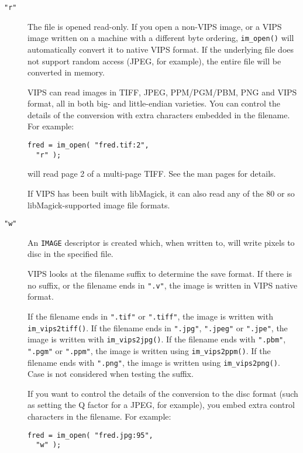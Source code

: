 \begin{description}

\item[\texttt{"r"}]
The file is opened read-only.
If you open a non-VIPS image, or a VIPS image written on a machine with a
different byte ordering, \verb+im_open()+ will automatically convert it to
native VIPS format. If the underlying file does not support random access
(JPEG, for example), the entire file will be converted in memory. 

VIPS can read images in TIFF, JPEG, PPM/\-PGM/\-PBM, PNG and VIPS
format, all in both big- and little-endian varieties. You can control the
details of the conversion with extra characters embedded in the filename. For
example:

\begin{verbatim}
fred = im_open( "fred.tif:2",
  "r" );
\end{verbatim}

\noindent
will read page 2 of a multi-page TIFF. See the man pages for details.

If VIPS has been built with libMagick, it can also read any of the 80 or so
libMagick-supported image file formats.

\item[\texttt{"w"}]
An \verb+IMAGE+ descriptor is created which, when written to, will write
pixels to disc in the specified file.

VIPS looks at the filename suffix to determine the save format. If there
is no suffix, or the filename ends in \verb+".v"+, the image is written
in VIPS native format. 

If the filename ends in \verb+".tif"+ or \verb+".tiff"+, the image
is written with \verb+im_vips2tiff()+.  If the filename ends in
\verb+".jpg"+, \verb+".jpeg"+ or \verb+".jpe"+, the image is written with
\verb+im_vips2jpg()+.  If the filename ends with \verb+".pbm"+, \verb+".pgm"+
or \verb+".ppm"+, the image is written using \verb+im_vips2ppm()+.
If the filename ends with \verb+".png"+, the image is written using
\verb+im_vips2png()+.  Case is not considered when testing the suffix.

If you want to control the details of the conversion to the disc format (such
as setting the Q factor for a JPEG, for example), you embed extra control
characters in the filename. For example:

\begin{verbatim}
fred = im_open( "fred.jpg:95", 
  "w" );
\end{verbatim}


\end{description}
